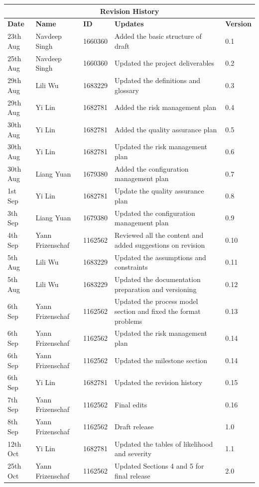 \documentclass[12pt]{article}
\begin{document}
\begin{table}
\begin{tabular}{ | p{}| p{}| p{}| p{}|p{}|}
\hline
\multicolumn{5}{|c|}{\textbf{Revision History}}\\
\hline
\textbf \textbf{Date} &  \textbf\textbf{Name} &  \textbf\textbf{ID} & \textbf\textbf {Updates} & \textbf\textbf{Version} \\
\hline
23th Aug & Navdeep Singh & 1660360 & Added the basic structure of draft  & 0.1\\
\hline
25th Aug & Navdeep Singh & 1660360 &Updated the project deliverables & 0.2\\
\hline
29th Aug & Lili Wu & 1683229 &Updated the definitions and glossary& 0.3\\
\hline
29th Aug&Yi Lin  &1682781  &Added the risk management plan & 0.4\\
\hline
 30th Aug&Yi Lin  &1682781 &Added the quality assurance plan & 0.5\\
\hline
 30th Aug&Yi Lin  &1682781  &Updated the risk management plan& 0.6\\ 
\hline
  30th Aug&Liang Yuan  &1679380  &Added the configuration management plan &0.7\\
\hline
 1st Sep&Yi Lin  &1682781  &Update the  quality assurance plan & 0.8\\
 \hline
 3th Sep&Liang Yuan  &1679380  & Updated the configuration management plan & 0.9\\
\hline
 4th Sep& Yann Frizenschaf &1162562   &Reviewed all the content and added suggestions on revision & 0.10\\
 \hline
 5th Aug & Lili Wu & 1683229 &Updated the assumptions and constraints& 0.11\\
\hline
5th Aug & Lili Wu & 1683229 &Updated the documentation preparation and versioning& 0.12\\
\hline
 6th Sep& Yann Frizenschaf &1162562   &Updated the process model section and fixed the format problems & 0.13\\
 \hline
  6th Sep& Yann Frizenschaf &1162562   &Updated the risk management plan & 0.14\\
 \hline
 6th Sep& Yann Frizenschaf &1162562   &Updated the milestone section & 0.14\\
 \hline
 6th Sep& Yi Lin &1682781   &Updated the revision history & 0.15\\
 \hline
 7th Sep & Yann Frizenschaf & 1162562 & Final edits & 0.16\\
\hline
 8th Sep & Yann Frizenschaf & 1162562 & Draft release & 1.0\\
\hline
12th Oct & Yi Lin & 1682781 & Updated the tables of likelihood and severity & 1.1\\
\hline
25th Oct & Yann Frizenschaf & 1162562 & Updated Sections 4 and 5 for final release & 2.0\\
\hline
\end{tabular}
\end{table} 
\pagebreak
\end{document}
